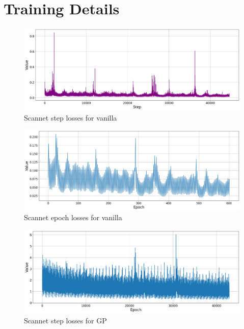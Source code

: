 
	\chapter{Training Details}
	
	\begin{figure}
		\centering
		\includegraphics[width=13cm]{images/scannet_step_vanilla_all.png}
		\caption{Scannet step losses for vanilla}
		\label{fig:android_result}
	\end{figure}

	\begin{figure}
		\centering
		\includegraphics[width=13cm]{images/scannet_epoch_vanilla_all.png}
		\caption{Scannet epoch losses for vanilla}
		\label{fig:android_result}
	\end{figure}

	\begin{figure}
		\centering
		\includegraphics[width=13cm]{images/scannet_gp_step.png}
		\caption{Scannet step losses for GP}
		\label{fig:android_result}
	\end{figure}

